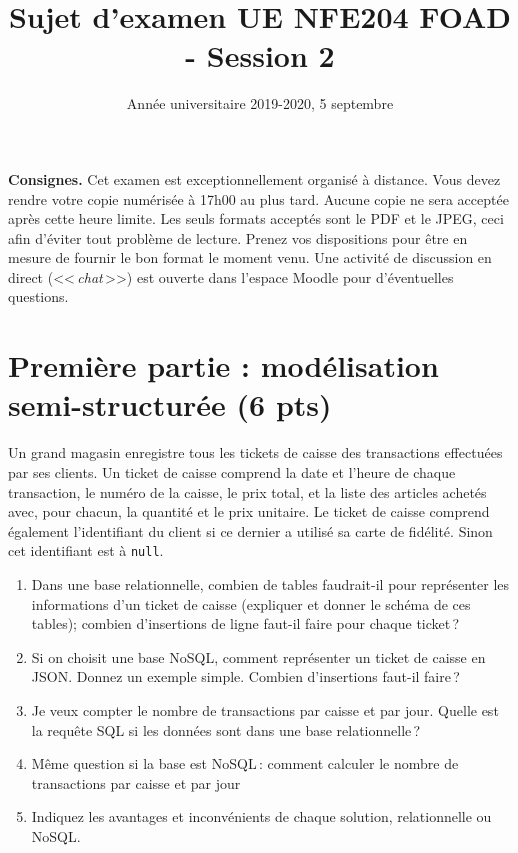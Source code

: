 \documentclass[11pt,a4paper]{article}
\newcommand{\guill}[1]{<<\,#1\,>>}
\begin{document}
\title{Sujet d'examen UE NFE204 FOAD - Session 2}
\author{Année universitaire 2019-2020, 5 septembre}
\date{\empty}

\maketitle

{\bf \Large Consignes.}
Cet examen est exceptionnellement organisé à distance. 
Vous devez rendre votre copie numérisée à 17h00 au plus tard. 
Aucune copie ne sera acceptée après cette heure limite. 
Les seuls formats acceptés sont le PDF et le JPEG, ceci afin d'éviter tout problème de lecture.  
Prenez vos dispositions pour être en mesure de fournir le bon format le moment venu. Une activité 
de discussion en direct (\guill{\textit{chat}}) est ouverte dans l'espace Moodle pour d'éventuelles questions.


\section*{Première partie : modélisation semi-structurée (6 pts)}

Un grand magasin enregistre tous les tickets de caisse des transactions effectuées par ses clients.
Un ticket de caisse comprend la date et l'heure de chaque transaction, le numéro de la caisse, le prix total,
et la liste des articles achetés avec, pour chacun, la quantité et le prix unitaire.  Le ticket de caisse comprend également
l'identifiant du client si ce dernier a utilisé sa carte de fidélité. Sinon cet identifiant
est à \texttt{null}.


\begin{enumerate}
  \item Dans une base relationnelle, combien de tables faudrait-il pour représenter 
         les informations d'un ticket de caisse (expliquer et donner le schéma de ces tables); combien d'insertions de ligne
             faut-il faire pour chaque ticket\,?
    \item Si on choisit une base NoSQL, comment représenter un ticket de caisse en JSON.
        Donnez un exemple simple. Combien d'insertions faut-il faire\,?
   \item Je veux compter le nombre de transactions par caisse et par jour.  Quelle est la requête SQL si les données
       sont dans une base relationnelle\,?
    \item Même question si la base est NoSQL\,: comment calculer le nombre de transactions par caisse et par jour
    \item Indiquez les avantages et inconvénients de chaque solution, relationnelle ou NoSQL.
 \end{enumerate}
\end{document}
